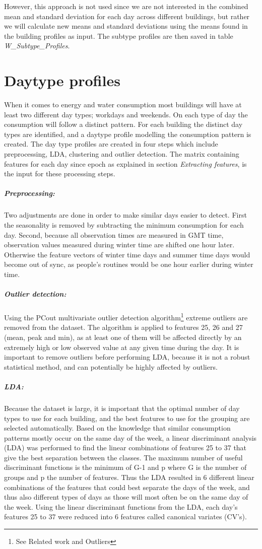 However, this approach is not used since we are not interested in the combined mean and standard deviation for each day across different buildings, but rather we will calculate new means and standard deviations using the means found in the building profiles as input. The subtype profiles are then saved in table \emph{W\_Subtype\_Profiles}.
\section*{Daytype profiles}
When it comes to energy and water consumption most buildings will have at least two different day types; workdays and weekends. On each type of day the consumption will follow a distinct pattern. For each building the distinct day types are identified, and a daytype profile modelling the consumption pattern is created. The day type profiles are created in four steps which include preprocessing, LDA, clustering and outlier detection. The matrix containing features for each day since epoch as explained in section \emph{Extracting features}, is the input for these processing steps.
\subparagraph{Preprocessing:}Two adjustments are done in order to make similar days easier to detect. First the seasonality is removed by subtracting the minimum consumption for each day. Second, because all observation times are measured in GMT time, observation values measured during winter time are shifted one hour later. Otherwise the feature vectors of winter time days and summer time days would become out of sync, as people's routines would be one hour earlier during winter time. 
\subparagraph{Outlier detection:}Using the PCout multivariate outlier detection algorithm\footnote{See Related work and Outliers}  extreme outliers are removed from the dataset. The algorithm is applied to features 25, 26 and 27 (mean, peak and min), as at least one of them will be affected directly by an extremely high or low observed value at any given time during the day. It is important to remove outliers before performing LDA, because it is not a robust statistical method, and can potentially be highly affected by outliers.
\subparagraph{LDA:}Because the dataset is large, it is important that the optimal number of day types to use for each building, and the best features to use for the grouping are selected automatically. Based on the knowledge that similar consumption patterns mostly occur on the same day of the week, a linear discriminant analysis (LDA) was performed to find the linear combinations of features 25 to 37 that give the best separation between the classes. The maximum number of useful discriminant functions is the minimum of G-1 and p where G is the number of groups and p the number of features. Thus the LDA resulted in 6 different linear combinations of the features that could best separate the days of the week, and thus also different types of days as those will most often be on the same day of the week. Using the linear discriminant functions from the LDA, each day’s features 25 to 37 were reduced into 6 features called canonical variates (CV’s).
